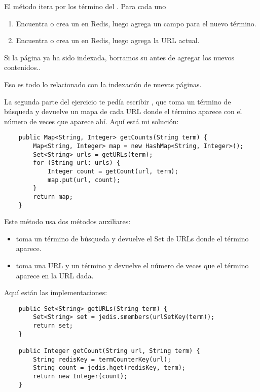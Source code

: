 \documentclass[12pt]{book}
\theoremstyle{exercise}
\begin{document}
El método itera por los término del . Para cada uno

\begin{enumerate}

\item
  Encuentra o crea un  en Redis, luego agrega un campo
  para el nuevo término.

\item
  Encuentra o crea un  en Redis, luego agrega la URL actual.

\end{enumerate}

Si la página ya ha sido indexada, borramos su 
antes de agregar los nuevos contenidos..

Eso es todo lo relacionado con la indexación de nuevas páginas.


La segunda parte del ejercicio te pedía escribir , que toma
un término de búsqueda y devuelve un mapa de cada URL donde el término
aparece con el número de veces que aparece ahí. Aquí está mi solución:

\begin{verbatim}
    public Map<String, Integer> getCounts(String term) {
        Map<String, Integer> map = new HashMap<String, Integer>();
        Set<String> urls = getURLs(term);
        for (String url: urls) {
            Integer count = getCount(url, term);
            map.put(url, count);
        }
        return map;
    }
\end{verbatim}

Este método usa dos métodos auxiliares:

\begin{itemize}

\item
   toma un término de búsqueda y devuelve el Set de URLs donde el
  término aparece.

\item
   toma una URL y un término y devuelve el número de veces que el
  término aparece en la URL dada.

\end{itemize}

Aquí están las implementaciones:

\begin{verbatim}
    public Set<String> getURLs(String term) {
        Set<String> set = jedis.smembers(urlSetKey(term));
        return set;
    }

    public Integer getCount(String url, String term) {
        String redisKey = termCounterKey(url);
        String count = jedis.hget(redisKey, term);
        return new Integer(count);
    }
\end{verbatim}
\end{document}
